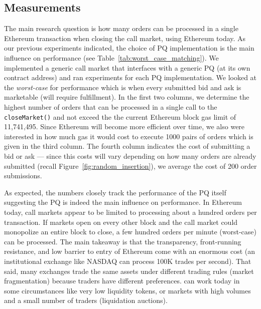 
 \subsection{Measurements}
  
 
 
 
The main research question is how many orders can be processed in a single Ethereum transaction when closing the call market, using Ethereum today. As our previous experiments indicated, the choice of PQ implementation is the main influence on performance (see Table~\ref{tab:worst_case_matching}). We implemented a generic call market that interfaces with a generic PQ (at its own contract address) and ran experiments for each PQ implementation. We looked at the \textit{worst-case} for performance which is when every submitted bid and ask is marketable (\ie will require fulfillment). In the first two columns, we determine the highest number of orders that can be processed in a single call to the \texttt{closeMarket()} and not exceed the the current Ethereum block gas limit of 11,741,495. Since Ethereum will become more efficient over time, we also were interested in how much gas it would cost to execute 1000 pairs of orders which is given in the third column. The fourth column indicates the cost of submitting a bid or ask --- since this costs will vary depending on how many orders are already submitted (recall Figure~\ref{fig:random_insertion}), we average the cost of 200 order submissions. 

As expected, the numbers closely track the performance of the PQ itself suggesting the PQ is indeed the main influence on performance. In Ethereum today, call markets appear to be limited to processing about a hundred orders per transaction. If markets open on every other block and the call market could monopolize an entire block to close, a few hundred orders per minute (worst-case) can be processed. The main takeaway is that the transparency, front-running resistance, and low barrier to entry of Ethereum come with an enormous cost (\ie an institutional exchange like NASDAQ can process 100K trades per second). That said, many exchanges trade the same assets under different trading rules (\ie market fragmentation) because traders have different preferences. \cm can work today in some circumstances like very low liquidity tokens, or markets with high volumes and a small number of traders (\eg liquidation auctions). 

